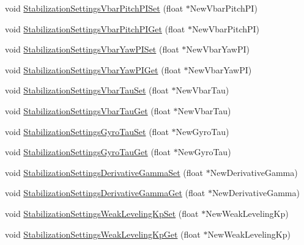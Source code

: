 \begin{DoxyCompactItemize}
\item 
void \hyperlink{group___stabilization_settings_gab571c7afdc3c33c8c84471063a015ebf}{\-Stabilization\-Settings\-Vbar\-Pitch\-P\-I\-Set} (float $\ast$\-New\-Vbar\-Pitch\-P\-I)
\item 
void \hyperlink{group___stabilization_settings_gaadd3d8adb4f7a645121e581d8fa05791}{\-Stabilization\-Settings\-Vbar\-Pitch\-P\-I\-Get} (float $\ast$\-New\-Vbar\-Pitch\-P\-I)
\item 
void \hyperlink{group___stabilization_settings_ga7c045bf59098bd70807c101f36fde2d7}{\-Stabilization\-Settings\-Vbar\-Yaw\-P\-I\-Set} (float $\ast$\-New\-Vbar\-Yaw\-P\-I)
\item 
void \hyperlink{group___stabilization_settings_ga559f3069d299b8c0de18450c66627113}{\-Stabilization\-Settings\-Vbar\-Yaw\-P\-I\-Get} (float $\ast$\-New\-Vbar\-Yaw\-P\-I)
\item 
void \hyperlink{group___stabilization_settings_ga4088bd0a01d31f742e8dd5e915437ea8}{\-Stabilization\-Settings\-Vbar\-Tau\-Set} (float $\ast$\-New\-Vbar\-Tau)
\item 
void \hyperlink{group___stabilization_settings_gae922117c02f964e61872d66b5fbbe3d4}{\-Stabilization\-Settings\-Vbar\-Tau\-Get} (float $\ast$\-New\-Vbar\-Tau)
\item 
void \hyperlink{group___stabilization_settings_ga8151df04f4d798c3e8a963a554e94603}{\-Stabilization\-Settings\-Gyro\-Tau\-Set} (float $\ast$\-New\-Gyro\-Tau)
\item 
void \hyperlink{group___stabilization_settings_gac83748a3b7aa210d842191ab474f3ef8}{\-Stabilization\-Settings\-Gyro\-Tau\-Get} (float $\ast$\-New\-Gyro\-Tau)
\item 
void \hyperlink{group___stabilization_settings_ga47236f00eb682f53b528fc4e88883637}{\-Stabilization\-Settings\-Derivative\-Gamma\-Set} (float $\ast$\-New\-Derivative\-Gamma)
\item 
void \hyperlink{group___stabilization_settings_ga29b785c7f99d052e609385ea137ddf62}{\-Stabilization\-Settings\-Derivative\-Gamma\-Get} (float $\ast$\-New\-Derivative\-Gamma)
\item 
void \hyperlink{group___stabilization_settings_ga48842da0c4453a8bda4959dbc4226f11}{\-Stabilization\-Settings\-Weak\-Leveling\-Kp\-Set} (float $\ast$\-New\-Weak\-Leveling\-Kp)
\item 
void \hyperlink{group___stabilization_settings_gae52f35bcf0d2506103ba86949170b673}{\-Stabilization\-Settings\-Weak\-Leveling\-Kp\-Get} (float $\ast$\-New\-Weak\-Leveling\-Kp)
\item 

\end{DoxyCompactItemize}
